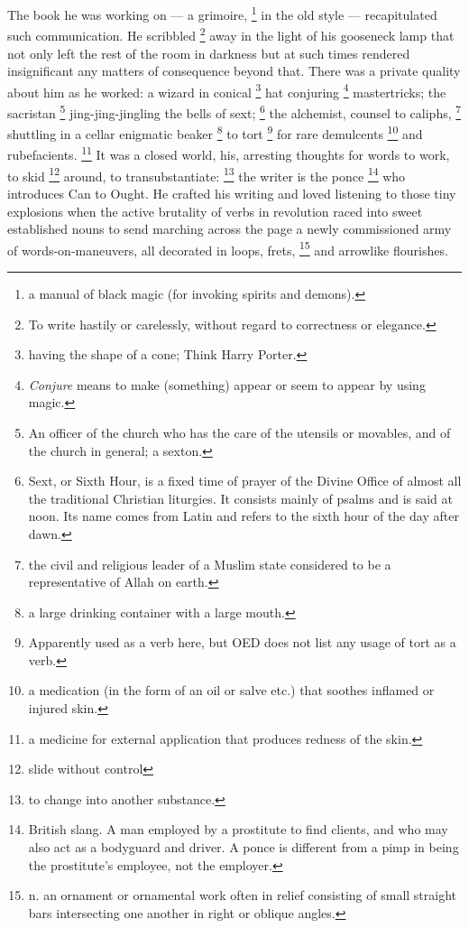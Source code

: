   The book he was working on --- a grimoire, 
\footnote{a manual of black magic (for invoking spirits and demons).}
in the old style --- recapitulated such
communication. He scribbled 
\footnote{To write hastily or carelessly, without regard to correctness or
elegance.}
away in the light of his gooseneck lamp that not
only left the rest of the room in darkness but at such times rendered
insignificant any matters of consequence beyond that. There was a private
quality about him as he worked: a wizard in conical 
\footnote{having the shape of a cone; Think Harry Porter.}
hat conjuring 
\footnote{\textit{Conjure} means to make (something) appear or seem to appear by
using magic.}
mastertricks; the sacristan 
\footnote{An officer of the church who has the care of the utensils or movables,
and of the church in general; a sexton.}
jing-jing-jingling the bells of sext; 
\footnote{Sext, or Sixth Hour, is a fixed time of prayer of the Divine Office of
almost all the traditional Christian liturgies. It consists mainly of psalms and
is said at noon. Its name comes from Latin and refers to the sixth hour of the
day after dawn. }
the alchemist, counsel to caliphs, 
\footnote{the civil and religious leader of a Muslim state considered to be a
representative of Allah on earth.}
shuttling in a cellar enigmatic beaker 
\footnote{a large drinking container with a large mouth.}
to tort 
\footnote{\textdbend Apparently used as a verb here, but OED does not list any
usage of tort as a verb.}
for rare demulcents 
\footnote{a medication (in the form of an oil or salve etc.) that soothes inflamed or
injured skin.}
and rubefacients. 
\footnote{a medicine for external application that produces redness of the skin.}
It was a closed world, his, arresting thoughts for words to work,
to skid 
\footnote{slide without control}
around, to transubstantiate: 
\footnote{to change into another substance.}
the writer is the ponce 
\footnote{British slang. A man employed by a prostitute to find clients, and 
who may also act as a bodyguard and driver. A ponce is different from a pimp 
in being the prostitute's employee, not the employer.
}
who introduces Can to Ought. He crafted his writing and loved listening to 
those tiny explosions when the active brutality of verbs in revolution raced 
into sweet established nouns to send marching across the page a newly 
commissioned army of words-on-maneuvers, all decorated in loops, frets, 
\footnote{n. an ornament or ornamental work often in relief consisting of small
straight bars intersecting one another in right or oblique angles.
}
and arrowlike flourishes.
